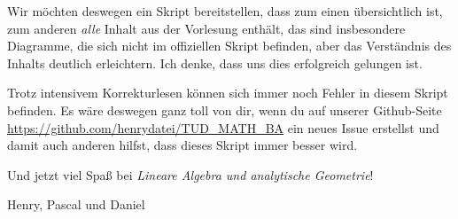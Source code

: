 Wir möchten deswegen ein Skript bereitstellen, dass zum einen übersichtlich ist, zum anderen \textit{alle} Inhalt aus der Vorlesung enthält, das sind insbesondere Diagramme, die sich nicht im offiziellen Skript befinden, aber das Verständnis des Inhalts deutlich erleichtern. Ich denke, dass uns dies erfolgreich gelungen ist.

Trotz intensivem Korrekturlesen können sich immer noch Fehler in diesem Skript befinden. Es wäre deswegen ganz toll von dir, wenn du auf unserer Github-Seite \url{https://github.com/henrydatei/TUD_MATH_BA} ein neues Issue erstellst und damit auch anderen hilfst, dass dieses Skript immer besser wird.

Und jetzt viel Spaß bei \textit{Lineare Algebra und analytische Geometrie}!

\begin{flushright}
	Henry, Pascal und Daniel
\end{flushright}